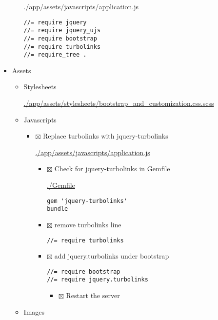 \documentclass[11pt]{article}
\begin{document}
\begin{itemize}
\begin{itemize}
\url{./app/assets/javascripts/application.js}

\begin{verbatim}
//= require jquery
//= require jquery_ujs
//= require bootstrap
//= require turbolinks
//= require_tree .
\end{verbatim}
\end{itemize}

\item Assets
\label{sec-1-3-2-3}

\begin{itemize}
\item Stylesheets
\label{sec-1-3-2-3-1}

\url{./app/assets/stylesheets/bootstrap_and_customization.css.scss}
\item Javascripts
\label{sec-1-3-2-3-2}

\begin{itemize}
\item $\boxtimes$ Replace turbolinks with jquery-turbolinks

\url{./app/assets/javascripts/application.js}

\begin{itemize}
\item $\boxtimes$ Check for jquery-turbolinks in Gemfile

\url{./Gemfile}

\begin{verbatim}
gem 'jquery-turbolinks'
bundle
\end{verbatim}

\item $\boxtimes$ remove turbolinks line

\begin{verbatim}
//= require turbolinks
\end{verbatim}

\item $\boxtimes$ add jquery.turbolinks under bootstrap

\begin{verbatim}
//= require bootstrap
//= require jquery.turbolinks
\end{verbatim}

\begin{itemize}
\item $\boxtimes$ Restart the server
\end{itemize}
\end{itemize}
\end{itemize}
\item Images
\label{sec-1-3-2-3-3}


\end{itemize}
\end{itemize}
\end{document}
